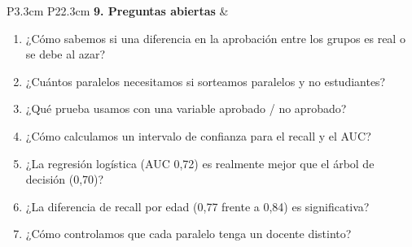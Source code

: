 \documentclass[10pt]{article}
\begin{document}
{\begin{longtable}{P{3.3cm} P{22.3cm}}
\textbf{9. Preguntas abiertas}
& \begin{enumerate}
\item ¿Cómo sabemos si una diferencia en la aprobación entre los grupos es real o se debe al azar?
\item ¿Cuántos paralelos necesitamos si sorteamos paralelos y no estudiantes?
\item ¿Qué prueba usamos con una variable aprobado / no aprobado?
\item ¿Cómo calculamos un intervalo de confianza para el recall y el AUC?
\item ¿La regresión logística (AUC 0,72) es realmente mejor que el árbol de decisión (0,70)?
\item ¿La diferencia de recall por edad (0,77 frente a 0,84) es significativa?
\item ¿Cómo controlamos que cada paralelo tenga un docente distinto?
\end{enumerate}\\
\end{longtable}
}
\end{document}
